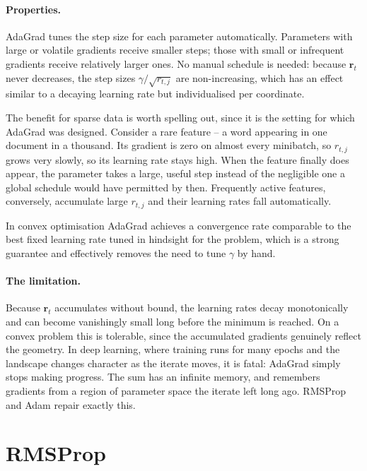\paragraph{Properties.}
AdaGrad tunes the step size for each parameter automatically.  Parameters with
large or volatile gradients receive smaller steps; those with small or
infrequent gradients receive relatively larger ones.  No manual schedule is
needed: because $\bm{r}_t$ never decreases, the step sizes
$\gamma/\sqrt{r_{t,j}}$ are non-increasing, which has an effect similar to a
decaying learning rate but individualised per coordinate.

The benefit for sparse data is worth spelling out, since it is the setting for
which AdaGrad was designed.  Consider a rare feature -- a word appearing in
one document in a thousand.  Its gradient is zero on almost every minibatch,
so $r_{t,j}$ grows very slowly, so its learning rate stays high.  When the
feature finally does appear, the parameter takes a large, useful step instead
of the negligible one a global schedule would have permitted by then.
Frequently active features, conversely, accumulate large $r_{t,j}$ and their
learning rates fall automatically.

In convex optimisation AdaGrad achieves a convergence rate comparable to the
best fixed learning rate tuned in hindsight for the problem, which is a strong
guarantee and effectively removes the need to tune $\gamma$ by hand.

\paragraph{The limitation.}
Because $\bm{r}_t$ accumulates without bound, the learning rates decay
monotonically and can become vanishingly small long before the minimum is
reached.  On a convex problem this is tolerable, since the accumulated
gradients genuinely reflect the geometry.  In deep learning, where training
runs for many epochs and the landscape changes character as the iterate moves,
it is fatal: AdaGrad simply stops making progress.  The sum has an infinite
memory, and remembers gradients from a region of parameter space the iterate
left long ago.  RMSProp and Adam repair exactly this.

\section{RMSProp}
\label{sec:rmsprop}

